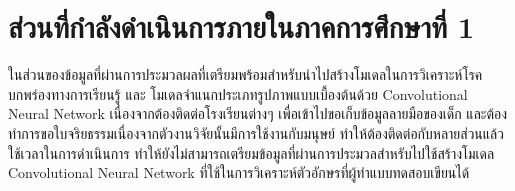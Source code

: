 \documentclass[12pt,oneside,openright,a4paper]{cpe-thai-project}
\begin{document}
\section{ส่วนที่กำลังดำเนินการภายในภาคการศึกษาที่ 1}
ในส่วนของข้อมูลที่ผ่านการประมวลผลที่เตรียมพร้อมสำหรับนำไปสร้างโมเดลในการวิเคราะห์โรคบกพร่องทางการเรียนรู้ และ  โมเดลจำแนกประเภทรูปภาพแบบเบื้องต้นด้วย Convolutional Neural Network
เนื่องจากต้องติดต่อโรงเรียนต่างๆ เพื่อเข้าไปขอเก็บข้อมูลลายมือของเด็ก และต้องทำการขอใบจริยธรรมเนื่องจากตัวงานวิจัยนั้นมีการใช้งานกับมนุษย์ ทำให้ต้องติดต่อกับหลายส่วนแล้วใช้เวลาในการดำเนินการ ทำให้ยังไม่สามารถเตรียมข้อมูลที่ผ่านการประมวลสำหรับไปใช้สร้างโมเดล Convolutional Neural Network ที่ใช้ในการวิเคราะห์ตัวอักษรที่ผู้ทำแบบทดสอบเขียนได้



\nocite{*}


\end{document}
